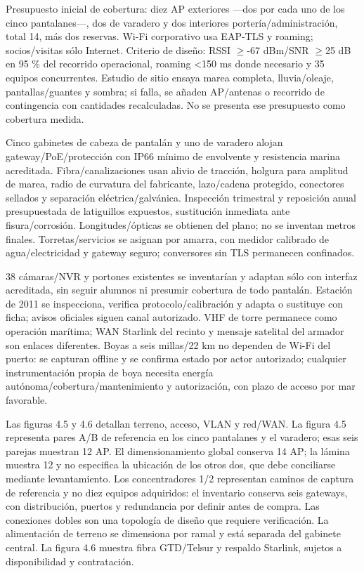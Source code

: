 \documentclass[11pt,letterpaper]{report}
\begin{document}
Presupuesto inicial de cobertura: diez AP exteriores ---dos por cada uno de los cinco pantalanes---, dos de varadero y dos interiores portería/administración, total 14, más dos reservas. Wi-Fi corporativo usa EAP-TLS y roaming; socios/visitas sólo Internet. Criterio de diseño: RSSI $\geq$-67 dBm/SNR $\geq$25 dB en 95 \% del recorrido operacional, roaming <150 ms donde necesario y 35 equipos concurrentes. Estudio de sitio ensaya marea completa, lluvia/oleaje, pantallas/guantes y sombra; si falla, se añaden AP/antenas o recorrido de contingencia con cantidades recalculadas. No se presenta ese presupuesto como cobertura medida.

Cinco gabinetes de cabeza de pantalán y uno de varadero alojan gateway/PoE/protección con IP66 mínimo de envolvente y resistencia marina acreditada. Fibra/canalizaciones usan alivio de tracción, holgura para amplitud de marea, radio de curvatura del fabricante, lazo/cadena protegido, conectores sellados y separación eléctrica/galvánica. Inspección trimestral y reposición anual presupuestada de latiguillos expuestos, sustitución inmediata ante fisura/corrosión. Longitudes/ópticas se obtienen del plano; no se inventan metros finales. Torretas/servicios se asignan por amarra, con medidor calibrado de agua/electricidad y gateway seguro; conversores sin TLS permanecen confinados.

38 cámaras/NVR y portones existentes se inventarían y adaptan sólo con interfaz acreditada, sin seguir alumnos ni presumir cobertura de todo pantalán. Estación de 2011 se inspecciona, verifica protocolo/calibración y adapta o sustituye con ficha; avisos oficiales siguen canal autorizado. VHF de torre permanece como operación marítima; WAN Starlink del recinto y mensaje satelital del armador son enlaces diferentes. Boyas a seis millas/22 km no dependen de Wi-Fi del puerto: se capturan offline y se confirma estado por actor autorizado; cualquier instrumentación propia de boya necesita energía autónoma/cobertura/mantenimiento y autorización, con plazo de acceso por mar favorable.

Las figuras 4.5 y 4.6 detallan terreno, acceso, VLAN y red/WAN. La figura 4.5 representa pares A/B de referencia en los cinco pantalanes y el varadero; esas seis parejas muestran 12 AP. El dimensionamiento global conserva 14 AP; la lámina muestra 12 y no especifica la ubicación de los otros dos, que debe conciliarse mediante levantamiento. Los concentradores 1/2 representan caminos de captura de referencia y no diez equipos adquiridos: el inventario conserva seis gateways, con distribución, puertos y redundancia por definir antes de compra. Las conexiones dobles son una topología de diseño que requiere verificación. La alimentación de terreno se dimensiona por ramal y está separada del gabinete central. La figura 4.6 muestra fibra GTD/Telsur y respaldo Starlink, sujetos a disponibilidad y contratación.
\end{document}
